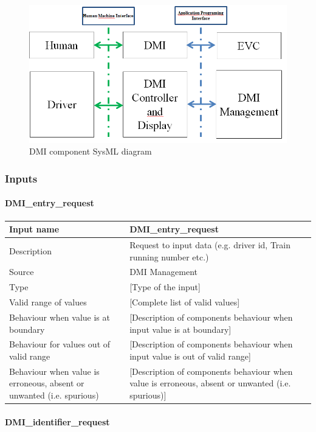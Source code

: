 \begin{figure}
\center
\includegraphics[width=.8\textwidth]{images/DMI_Interfaces}
\caption{DMI component SysML diagram}\label{f:DMI_interface}
\end{figure}


\subsubsection{Inputs}\label{s:DMI_inputs}

\paragraph{DMI\_entry\_request}

\begin{longtable}{p{}p{}}
\toprule
Input name				& DMI\_entry\_request \\
\midrule
Description				& Request to input data (e.g. driver id, Train running number etc.) \\
\midrule
Source					& DMI Management \\ 
\midrule
Type					& [Type of the input] \\
\midrule
Valid range of values	& [Complete list of valid values] \\
\midrule
Behaviour when value is at boundary	& [Description of components behaviour when input value is at boundary] \\
\midrule
Behaviour for values out of valid range	& [Description of components behaviour when input value is out of valid range] \\
\midrule
Behaviour when value is erroneous, absent or unwanted (i.e. spurious) & [Description of components behaviour when value is erroneous, absent or unwanted (i.e. spurious)] \\
\bottomrule
\end{longtable}

\paragraph{DMI\_identifier\_request}

